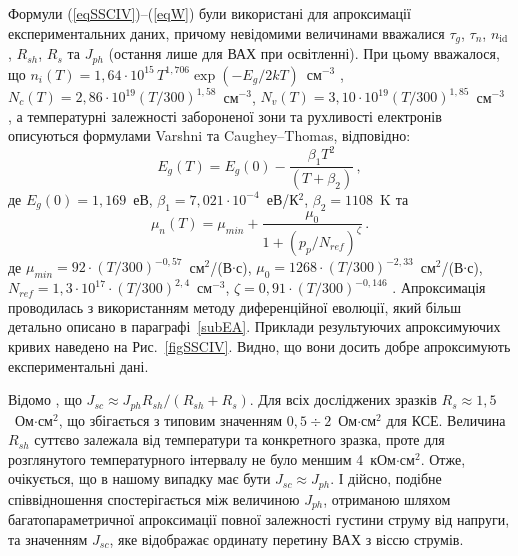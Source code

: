Формули (\ref{eqSSCIV})--(\ref{eqW}) були використані для апроксимації експериментальних даних, причому
невідомими величинами вважалися $\tau_g$, $\tau_n$, $n_{\mathrm{id}}$, $R_{sh}$, $R_s$ та  $J_{ph}$ (остання лише для ВАХ при освітленні).
При цьому вважалося, що
$n_i(T)=1,64\cdot10^{15}\,T^{1,706}\exp(-E_g/2kT)$~см$^{-3}$ \cite{ni:Green}, $N_c(T)=2,86\cdot10^{19}(T/300)^{1,58}$~см$^{-3}$, $N_v(T)=3,10\cdot10^{19}(T/300)^{1,85}$~см$^{-3}$
\cite{Nc:Green},
а температурні залежності забороненої зони та рухливості електронів описуються формулами Varshni та Caughey--Thomas, відповідно:
\begin{equation}
\label{eqEg}
 E_g(T) = E_g(0) - \frac{\beta_1 T^2}{(T + \beta_2)}\,,
\end{equation}
де
$E_g(0)=1,169$~еВ,
$\beta_1=7,021\cdot10^{-4}$~еВ/К$^2$,
$\beta_2=1108$~K \cite{Schroder2006,Markvart} та
\begin{equation}
\label{eqMu}
\mu_n(T) = \mu_{min}+\frac{\mu_0}{1+(p_p/N_{ref})^{\zeta}}\,.
\end{equation}
де
$\mu_{min}=92\cdot(T/300)^{-0,57}$~см$^2$/(В$\cdot$с),
$\mu_0=1268\cdot(T/300)^{-2,33}$~см$^2$/(В$\cdot$с),
$N_{ref}=1,3\cdot10^{17}\cdot(T/300)^{2,4}$~см$^{-3}$,
$\zeta=0,91\cdot(T/300)^{-0,146}$ \cite[с.~505, Table~A8.2]{Schroder2006}.
Апроксимація проводилась з використанням методу диференційної еволюції\cite{DE:Sun,DEWang,DEModif}, який більш детально описано в параграфі~\ref{subEA}.
Приклади результуючих апроксимуючих кривих наведено  на Рис.~\ref{figSSCIV}.
Видно, що вони досить добре апроксимують експериментальні дані.

Відомо \cite{2Diod:Buhler}, що $J_{sc}\approx J_{ph}R_{sh}/(R_{sh}+R_{s})$.
Для всіх досліджених зразків $R_s\approx1,5$~Ом$\cdot$см$^2$,
що збігається з типовим значенням $0,5\div2$~Ом$\cdot$см$^2$ \cite{Breitenstein2013,SCRs:Mette} для КСЕ.
Величина $R_{sh}$ суттєво залежала від температури та конкретного зразка, проте для
розглянутого температурного інтервалу не було меншим  4~кОм$\cdot$см$^2$.
Отже, очікується, що в нашому випадку має бути $J_{sc}\approx J_{ph}$.
І дійсно, подібне співвідношення спостерігається між величиною $J_{ph}$, отриманою шляхом багатопараметричної апроксимації
повної залежності густини струму від напруги, та значенням $J_{sc}$, яке відображає ординату перетину ВАХ з віссю струмів.


